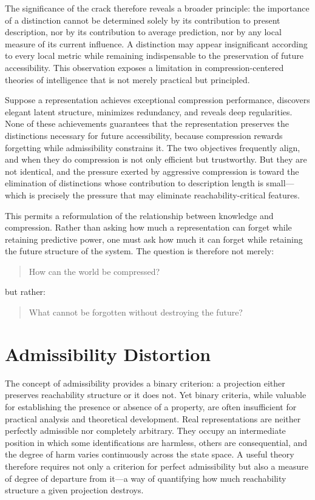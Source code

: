 \documentclass[12pt,a4paper]{article}
\theoremstyle{plain}
\theoremstyle{definition}
\theoremstyle{remark}
\begin{document}
The significance of the crack therefore reveals a broader principle: the
importance of a distinction cannot be determined solely by its contribution
to present description, nor by its contribution to average prediction, nor
by any local measure of its current influence. A distinction may appear
insignificant according to every local metric while remaining indispensable
to the preservation of future accessibility. This observation exposes a
limitation in compression-centered theories of intelligence that is not
merely practical but principled.

Suppose a representation achieves exceptional compression performance,
discovers elegant latent structure, minimizes redundancy, and reveals deep
regularities. None of these achievements guarantees that the representation
preserves the distinctions necessary for future accessibility, because
compression rewards forgetting while admissibility constrains it. The two
objectives frequently align, and when they do compression is not only
efficient but trustworthy. But they are not identical, and the pressure
exerted by aggressive compression is toward the elimination of distinctions
whose contribution to description length is small---which is precisely the
pressure that may eliminate reachability-critical features.

This permits a reformulation of the relationship between knowledge and
compression. Rather than asking how much a representation can forget while
retaining predictive power, one must ask how much it can forget while
retaining the future structure of the system. The question is therefore not
merely:
\begin{quote}
  How can the world be compressed?
\end{quote}
but rather:
\begin{quote}
  What cannot be forgotten without destroying the future?
\end{quote}

\section{Admissibility Distortion}

The concept of admissibility provides a binary criterion: a projection either
preserves reachability structure or it does not. Yet binary criteria, while
valuable for establishing the presence or absence of a property, are often
insufficient for practical analysis and theoretical development. Real
representations are neither perfectly admissible nor completely arbitrary.
They occupy an intermediate position in which some identifications are
harmless, others are consequential, and the degree of harm varies
continuously across the state space. A useful theory therefore requires not
only a criterion for perfect admissibility but also a measure of degree of
departure from it---a way of quantifying how much reachability structure a
given projection destroys.
\end{document}
